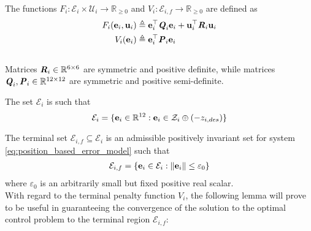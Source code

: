 The functions
$F_i : \mathcal{E}_i \times \mathcal{U}_i \to \mathbb{R}_{\geq 0}$ and
$V_i: \mathcal{E}_{i,f} \to \mathbb{R}_{\geq 0}$ are defined as
\begin{align}
  F_i (\bm{\mathbf{e}}_i, \bm{\mathbf{u}}_i)
  &\triangleq \bm{\mathbf{e}}_i^{\top} \bm{\mathit{Q}}_i \bm{\mathbf{e}}_i + \bm{\mathbf{u}}_i^{\top} \bm{\mathit{R}}_i \bm{\mathbf{u}}_i\\
  V_i (\bm{\mathbf{e}}_i) & \triangleq \bm{\mathbf{e}}_i^{\top} \bm{\mathit{P}}_i \bm{\mathbf{e}}_i
\end{align}\\
Matrices $\bm{\mathit{R}}_i \in \mathbb{R}^{6 \times 6}$ are symmetric and positive
definite, while matrices $\bm{\mathit{Q}}_i, \bm{\mathit{P}}_i \in \mathbb{R}^{12 \times 12}$
are symmetric and positive semi-definite.

The set $\mathcal{E}_i$ is such that
$$\mathcal{E}_i = \{\bm{\mathbf{e}}_i \in \mathbb{R}^{12} : \bm{\mathbf{e}}_i \in \mathcal{Z}_i \oplus (-z_{i,des} )\}$$

The terminal set $\mathcal{E}_{i,f} \subseteq \mathcal{E}_i$ is an admissible
positively invariant set  for system
\eqref{eq:position_based_error_model} such that
\begin{align}
  \mathcal{E}_{i,f} = \{\bm{\mathbf{e}}_i \in \mathcal{E}_i : \|\bm{\mathbf{e}}_i\| \leq \varepsilon_0 \}
\end{align}
where $\varepsilon_0$ is an arbitrarily small but fixed positive real scalar.\\

With regard to the terminal penalty function $V_i$, the following lemma will
prove to be useful in guaranteeing the convergence of the solution to the
optimal control problem to the terminal region $\mathcal{E}_{i,f}$:

